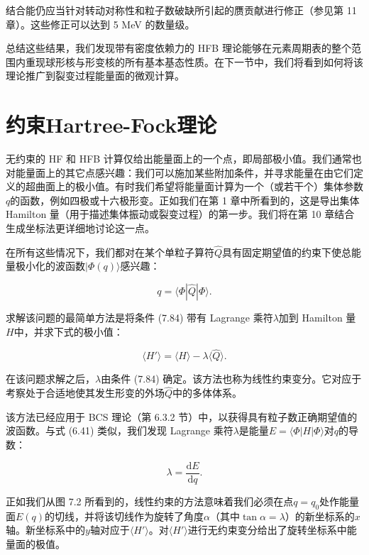 结合能仍应当针对转动对称性和粒子数破缺所引起的赝贡献进行修正（参见第 11 章）。这些修正可以达到 5 MeV 的数量级\cite{FQV73}。

总结这些结果，我们发现带有密度依赖力的 HFB 理论能够在元素周期表的整个范围内重现球形核与形变核的所有基本基态性质。在下一节中，我们将看到如何将该理论推广到裂变过程能量面的微观计算。

\section{约束Hartree-Fock理论\label{sec:=007EA6=00675FHartree-Fock=007406=008BBA}}

无约束的 HF 和 HFB 计算仅给出能量面上的一个点，即局部极小值。我们通常也对能量面上的其它点感兴趣：我们可以施加某些附加条件，并寻求能量在由它们定义的超曲面上的极小值。有时我们希望将能量面计算为一个（或若干个）集体参数$q$的函数，例如四极或十六极形变。正如我们在第
1 章中所看到的，这是导出集体 Hamilton 量（用于描述集体振动或裂变过程）的第一步。我们将在第 10 章结合生成坐标法更详细地讨论这一点。

在所有这些情况下，我们都对在某个单粒子算符$\hat{Q}$具有固定期望值的约束下使总能量极小化的波函数$|\Phi(q)\rangle$感兴趣：

\begin{equation}
q=\langle\Phi|\hat{Q}|\Phi\rangle.\label{eq:constraint_expectation_q}
\end{equation}

求解该问题的最简单方法是将条件 (7.84) 带有 Lagrange 乘符$\lambda$加到 Hamilton 量$H$中，并求下式的极小值：

\begin{equation}
\langle H'\rangle=\langle H\rangle-\lambda\langle\hat{Q}\rangle.\label{eq:linear_constraint_H_prime}
\end{equation}

在该问题求解之后，$\lambda$由条件 (7.84) 确定。该方法也称为线性约束变分。它对应于考察处于合适地使其发生形变的外场$\hat{Q}$中的多体体系。

该方法已经应用于 BCS 理论（第 6.3.2 节）中，以获得具有粒子数正确期望值的波函数。与式 (6.41) 类似，我们发现 Lagrange
乘符$\lambda$是能量$E=\langle\Phi|H|\Phi\rangle$对$q$的导数：

\begin{equation}
\lambda=\frac{\mathrm{d}E}{\mathrm{d}q}.\label{eq:lambda_dE_dq}
\end{equation}

正如我们从图 7.2 所看到的，线性约束的方法意味着我们必须在点$q=q_{0}$处作能量面$E(q)$的切线，并将该切线作为旋转了角度$\alpha$（其中$\tan\alpha=\lambda$）的新坐标系的$x$轴。新坐标系中的$y$轴对应于$\langle H'\rangle$。对$\langle H'\rangle$进行无约束变分给出了旋转坐标系中能量面的极值。

